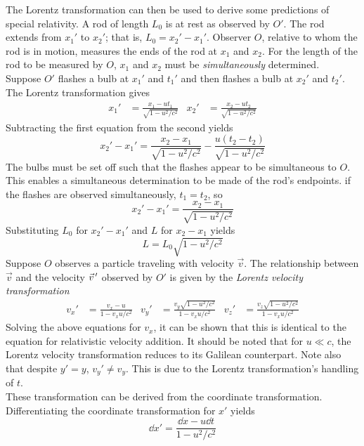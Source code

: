 \documentclass{subfiles}
\begin{document}
		The Lorentz transformation can then be used to derive some predictions of special relativity.
			A rod of length \(L_0\) is at rest as observed by \(O'\). The rod extends from \(x_1'\) to \(x_2'\); that is, \(L_0 = x_2' - x_1'\). Observer \(O\), relative to whom the rod is in motion, measures the ends of the rod at \(x_1\) and \(x_2\). For the length of the rod to be measured by \(O\), \(x_1\) and \(x_2\) must be \textit{simultaneously} determined. \\
			Suppose \(O'\) flashes a bulb at \(x_1'\) and \(t_1'\) and then flashes a bulb at \(x_2'\) and \(t_2'\). The Lorentz transformation gives
				\begin{align*}
					x_1' &= \frac{x_1 - ut_1}{\sqrt{1 - u^2/c^2}} &
						x_2' &= \frac{x_2 - ut_2}{\sqrt{1 - u^2/c^2}}	
				\end{align*}
				Subtracting the first equation from the second yields
				\[x_2' - x_1' = \frac{x_2 - x_1}{\sqrt{1 - u^2/c^2}} - \frac{u(t_2 - t_2)}{\sqrt{1 - u^2/c^2}}\]
				The bulbs must be set off such that the flashes appear to be simultaneous to \(O\). This enables a simultaneous determination to be made of the rod's endpoints. if the flashes are observed simultaneously, \(t_1 = t_2\), so
				\[x_2' - x_1' = \frac{x_2 - x_1}{\sqrt{1 - u^2/c^2}}\]
				Substituting \(L_0\) for \(x_2' - x_1'\) and \(L\) for \(x_2 - x_1\) yields
				\[L = L_0\sqrt{1 - u^2/c^2}\]
			Suppose \(O\) observes a particle traveling with velocity \(\vec{v}\). The relationship between \(\vec{v}\) and the velocity \(\vec{v}\hspace{0.5mm}'\) observed by \(O'\) is given by the \textit{Lorentz velocity transformation}
				\begin{align*}
					v_x' &= \frac{v_x - u}{1 - v_xu/c^2} &
						v_y' &= \frac{v_y\sqrt{1 - u^2/c^2}}{1 - v_xu/c^2} &
						v_z' &= \frac{v_z\sqrt{1 - u^2/c^2}}{1 - v_xu/c^2}
							\tag{Lorentz velocity transformation}	
				\end{align*}
				Solving the above equations for \(v_x\), it can be shown that this is identical to the equation for relativistic velocity addition. It should be noted that for \(u \ll c\), the Lorentz velocity transformation reduces to its Galilean counterpart. Note also that despite \(y' = y\), \(v_y' \ne v_y\). This is due to the Lorentz transformation's handling of \(t\). \\
				These transformation can be derived from the coordinate transformation. 
				Differentiating the coordinate transformation for \(x'\) yields
				\[\dd{x'} = \frac{\dd{x} - u\dd{t}}{1 - u^2/c^2}\]
\end{document}
